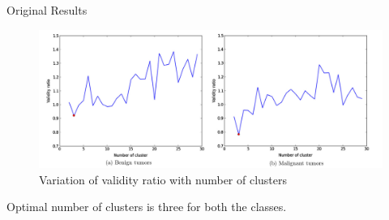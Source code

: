 \documentclass[xcolor=dvipsnames]{beamer}
\begin{document}
\begin{frame}{Original Results}
\begin{figure}[H]
  \begin{center}
    \includegraphics[scale=0.2]{Figures/BenignMalignantOriginal}
  \end{center}
  \caption{Variation of validity ratio with number of clusters}
\end{figure}

Optimal number of clusters is \alert{three} for both the classes.
\end{frame}
\end{document}
